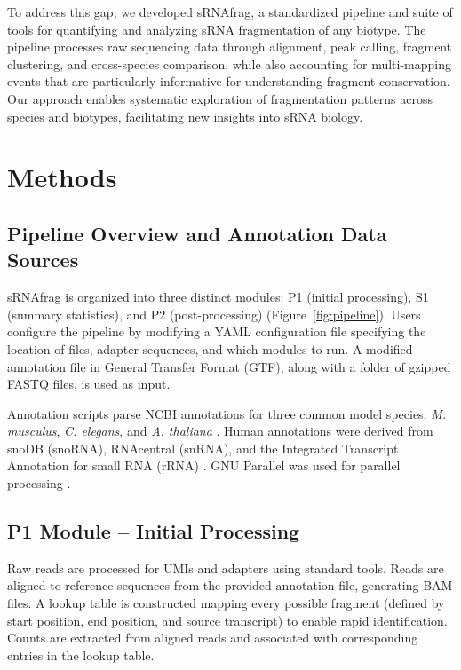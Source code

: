 \documentclass[11pt]{article}
\begin{document}
To address this gap, we developed sRNAfrag, a standardized pipeline and suite of tools for quantifying and analyzing sRNA fragmentation of any biotype. The pipeline processes raw sequencing data through alignment, peak calling, fragment clustering, and cross-species comparison, while also accounting for multi-mapping events that are particularly informative for understanding fragment conservation. Our approach enables systematic exploration of fragmentation patterns across species and biotypes, facilitating new insights into sRNA biology.

\section{Methods}

\subsection{Pipeline Overview and Annotation Data Sources}

sRNAfrag is organized into three distinct modules: P1 (initial processing), S1 (summary statistics), and P2 (post-processing) (Figure~\ref{fig:pipeline}). Users configure the pipeline by modifying a YAML configuration file specifying the location of files, adapter sequences, and which modules to run. A modified annotation file in General Transfer Format (GTF), along with a folder of gzipped FASTQ files, is used as input.

Annotation scripts parse NCBI annotations for three common model species: \textit{M. musculus}, \textit{C. elegans}, and \textit{A. thaliana} \citep{NCBI2023}. Human annotations were derived from snoDB (snoRNA), RNAcentral (snRNA), and the Integrated Transcript Annotation for small RNA (rRNA) \citep{Fafard2022,RNAcentral2021,Patel2022}. GNU Parallel was used for parallel processing \citep{Tange2011}.

\subsection{P1 Module -- Initial Processing}

Raw reads are processed for UMIs and adapters using standard tools. Reads are aligned to reference sequences from the provided annotation file, generating BAM files. A lookup table is constructed mapping every possible fragment (defined by start position, end position, and source transcript) to enable rapid identification. Counts are extracted from aligned reads and associated with corresponding entries in the lookup table.
\end{document}
